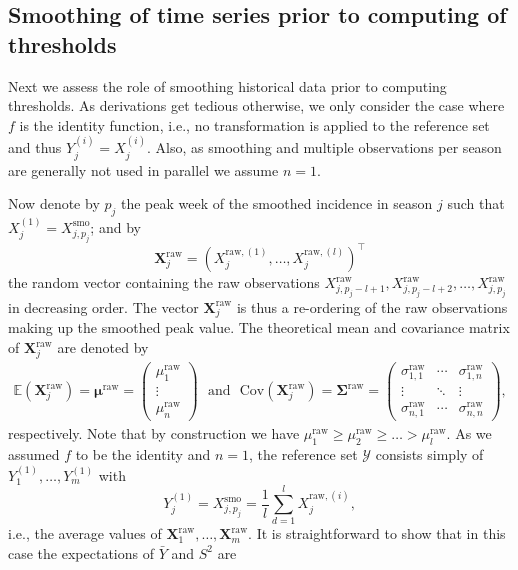 \documentclass{article}
\begin{document}
\subsection{Smoothing of time series prior to computing of thresholds}
\label{subsec:smoothing}

Next we assess the role of smoothing historical data prior to computing thresholds. As derivations get tedious otherwise, we only consider the case where $f$ is the identity function, i.e., no transformation is applied to the reference set and thus $
Y^{(i)}_j = X^{(i)}_j$. Also, as smoothing and multiple observations per season are generally not used in parallel we assume $n = 1$.

Now denote by $p_j$ the peak week of the smoothed incidence in season $j$ such that $X_j^{(1)} = X^{\text{smo}}_{j, p_j}$; and by
$$
\mathbf{X}^\text{raw}_j = (X_j^{\text{raw}, (1)}, \dots, X_j^{\text{raw}, (l)})^\top
$$
the random vector containing the raw observations $X^\text{raw}_{j, p_j - l + 1}, X^\text{raw}_{j, p_j - l + 2}, \dots, X^\text{raw}_{j, p_j}$ in decreasing order. The vector $\mathbf{X}^\text{raw}_j$ is thus a re-ordering of the raw observations making up the smoothed peak value. The theoretical mean and covariance matrix of $\mathbf{X}^\text{raw}_j$ are denoted by
\begin{align}
\mathbb{E}\left(\mathbf{X}^\text{raw}_j\right) = \boldsymbol{\mu}^\text{raw} = \left(\begin{array}{c}
\mu^\text{raw}_1\\
\vdots\\
\mu^\text{raw}_n
\end{array}\right) \ \ \ \text{and} \ \ \ \text{Cov}\left(\mathbf{X}^\text{raw}_j\right) = \boldsymbol{\Sigma}^\text{raw} =
\left(\begin{array}{ccc}
\sigma^\text{raw}_{1, 1} & \cdots & \sigma^\text{raw}_{1, n}\\
\vdots & \ddots &\vdots\\
\sigma^\text{raw}_{n, 1} & \cdots & \sigma^\text{raw}_{n, n}
\end{array}\right),
\end{align}
respectively. Note that by construction we have $\mu^\text{raw}_1 \geq \mu^\text{raw}_2 \geq \dots > \mu^\text{raw}_l$. As we assumed $f$ to be the identity and $n = 1$, the reference set $\mathcal{Y}$ consists simply of $Y^{(1)}_1, \dots, Y^{(1)}_m$ with
$$
Y^{(1)}_j = X^{\text{smo}}_{j, p_j} = \frac{1}{l} \sum_{d = 1}^l X^{\text{raw}, (i)}_{j},
$$
i.e., the average values of $\mathbf{X}^\text{raw}_{1}, \dots, \mathbf{X}^\text{raw}_{m}$. It is straightforward to show that in this case the expectations of $\bar{Y}$ and $S^2$ are
\end{document}
